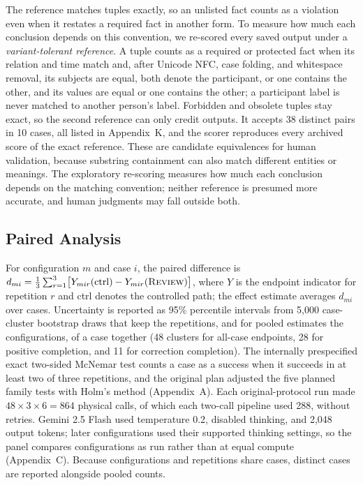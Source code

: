 \documentclass[acmsmall,review,anonymous]{acmart}
\newcommand{\rulesub}[1]{\text{\textsc{#1}}}
\begin{document}
The reference matches tuples exactly, so an unlisted fact counts as a violation even when it restates a required fact in another form. To measure how much each conclusion depends on this convention, we re-scored every saved output under a \emph{variant-tolerant reference}. A tuple counts as a required or protected fact when its relation and time match and, after Unicode NFC, case folding, and whitespace removal, its subjects are equal, both denote the participant, or one contains the other, and its values are equal or one contains the other; a participant label is never matched to another person's label. Forbidden and obsolete tuples stay exact, so the second reference can only credit outputs. It accepts 38 distinct pairs in 10 cases, all listed in Appendix~K, and the scorer reproduces every archived score of the exact reference. These are candidate equivalences for human validation, because substring containment can also match different entities or meanings. The exploratory re-scoring measures how much each conclusion depends on the matching convention; neither reference is presumed more accurate, and human judgments may fall outside both.

\subsection{Paired Analysis}\label{sec:analysis}
For configuration $m$ and case $i$, the paired difference is $d_{mi}=\tfrac{1}{3}\sum_{r=1}^{3}\bigl[Y_{mir}(\mathrm{ctrl})-Y_{mir}(\rulesub{Review})\bigr]$, where $Y$ is the endpoint indicator for repetition $r$ and ctrl denotes the controlled path; the effect estimate averages $d_{mi}$ over cases. Uncertainty is reported as 95\% percentile intervals from 5,000 case-cluster bootstrap draws that keep the repetitions, and for pooled estimates the configurations, of a case together (48 clusters for all-case endpoints, 28 for positive completion, and 11 for correction completion). The internally prespecified exact two-sided McNemar test counts a case as a success when it succeeds in at least two of three repetitions, and the original plan adjusted the five planned family tests with Holm's method (Appendix~A). Each original-protocol run made $48\times3\times6=864$ physical calls, of which each two-call pipeline used 288, without retries. Gemini 2.5 Flash used temperature 0.2, disabled thinking, and 2,048 output tokens; later configurations used their supported thinking settings, so the panel compares configurations as run rather than at equal compute (Appendix~C). Because configurations and repetitions share cases, distinct cases are reported alongside pooled counts.
\end{document}
